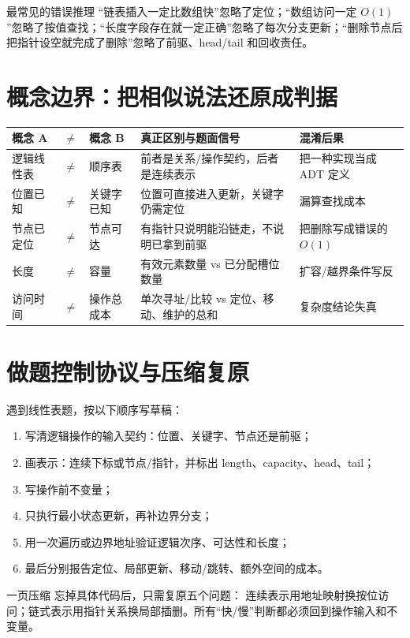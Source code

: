 \documentclass[UTF8,fontset=none,11pt,a4paper]{ctexart}
\begin{document}
\begin{warnbox}{最常见的错误推理}
“链表插入一定比数组快”忽略了定位；“数组访问一定 $O(1)$”忽略了按值查找；“长度字段存在就一定正确”忽略了每次分支更新；“删除节点后把指针设空就完成了删除”忽略了前驱、head/tail 和回收责任。
\end{warnbox}

\section{概念边界：把相似说法还原成判据}
\begin{center}\small
\begin{tabularx}{\linewidth}{L{1.8cm}C{0.35cm}L{1.8cm}Y Y}
\toprule
概念 A & $\neq$ & 概念 B & 真正区别与题面信号 & 混淆后果\\
\midrule
逻辑线性表 & $\neq$ & 顺序表 & 前者是关系/操作契约，后者是连续表示 & 把一种实现当成 ADT 定义\\
位置已知 & $\neq$ & 关键字已知 & 位置可直接进入更新，关键字仍需定位 & 漏算查找成本\\
节点已定位 & $\neq$ & 节点可达 & 有指针只说明能沿链走，不说明已拿到前驱 & 把删除写成错误的 $O(1)$\\
长度 & $\neq$ & 容量 & 有效元素数量 vs 已分配槽位数量 & 扩容/越界条件写反\\
访问时间 & $\neq$ & 操作总成本 & 单次寻址/比较 vs 定位、移动、维护的总和 & 复杂度结论失真\\
\bottomrule
\end{tabularx}\end{center}

\section{做题控制协议与压缩复原}
遇到线性表题，按以下顺序写草稿：
\begin{enumerate}
\item 写清逻辑操作的输入契约：位置、关键字、节点还是前驱；
\item 画表示：连续下标或节点/指针，并标出 length、capacity、head、tail；
\item 写操作前不变量；
\item 只执行最小状态更新，再补边界分支；
\item 用一次遍历或边界地址验证逻辑次序、可达性和长度；
\item 最后分别报告定位、局部更新、移动/跳转、额外空间的成本。
\end{enumerate}

\begin{corebox}{一页压缩}
忘掉具体代码后，只需复原五个问题：
连续表示用地址映射换按位访问；链式表示用指针关系换局部插删。所有“快/慢”判断都必须回到操作输入和不变量。
\end{corebox}
\end{document}
